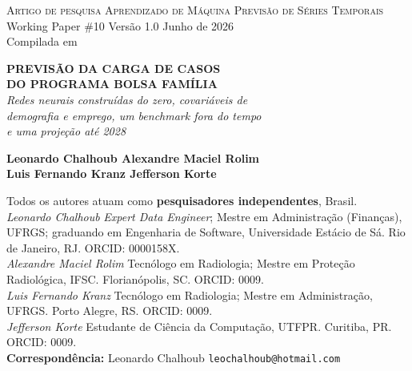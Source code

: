 \documentclass[12pt,a4paper,oneside]{article}
\begin{document}
\begin{titlepage}
  \begin{center}
    \vspace*{1.0cm}
    {\small\textsc{Artigo de pesquisa \quad\textbar\quad Aprendizado de Máquina \textendash{} Previsão de Séries Temporais}}\\
    {\small Working Paper \#10 \textemdash{} Versão 1.0 \textemdash{} Junho de 2026}\\[2pt]
    {\footnotesize Compilada em \COMPILESTAMP\ \textbullet\ \texttt{\COMPILESHA}}

    \vfill

    {\LARGE\bfseries
     PREVISÃO DA CARGA DE CASOS\\[6pt]
     DO PROGRAMA BOLSA FAMÍLIA}\\[14pt]

    {\large
      \textit{Redes neurais construídas do zero, covariáveis de\\
      demografia e emprego, um benchmark fora do tempo\\
      e uma projeção até 2028}}

    \vfill

    {\large\bfseries Leonardo Chalhoub \quad\textbullet\quad Alexandre Maciel Rolim}\\[4pt]
    {\large\bfseries Luis Fernando Kranz \quad\textbullet\quad Jefferson Korte}\\[10pt]
    \begin{minipage}{0.90\textwidth}\centering\footnotesize
      Todos os autores atuam como \textbf{pesquisadores independentes}, Brasil.\\[4pt]
      \textit{Leonardo Chalhoub} \textemdash{} \textit{Expert Data Engineer}; Mestre em
      Administração (Finanças), UFRGS; graduando em Engenharia de Software,
      Universidade Estácio de Sá. Rio de Janeiro, RJ. ORCID: 0000\-158X.\\[2pt]
      \textit{Alexandre Maciel Rolim} \textemdash{} Tecnólogo em Radiologia; Mestre em
      Proteção Radiológica, IFSC. Florianópolis, SC. ORCID: 0009.\\[2pt]
      \textit{Luis Fernando Kranz} \textemdash{} Tecnólogo em Radiologia; Mestre em
      Administração, UFRGS. Porto Alegre, RS. ORCID: 0009.\\[2pt]
      \textit{Jefferson Korte} \textemdash{} Estudante de Ciência da Computação, UTFPR.
      Curitiba, PR. ORCID: 0009.\\[4pt]
      \textbf{Correspondência:} Leonardo Chalhoub \textbullet{} \texttt{leochalhoub@hotmail.com}
    \end{minipage}


\end{center}
\end{titlepage}
\end{document}
